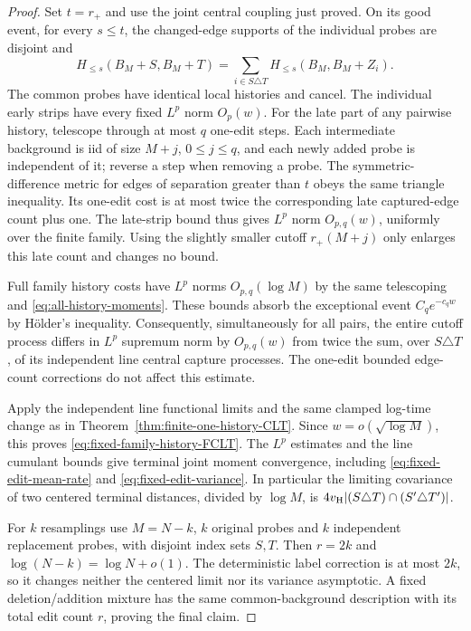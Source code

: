 \documentclass[11pt,letterpaper]{article}
\begin{document}
\begin{proof}
Set $t=r_+$ and use the joint central coupling just proved.
On its good event, for every $s\le t$, the changed-edge supports
of the individual probes are disjoint and
\[
 H_{\le s}(B_M+S,B_M+T)
       =\sum_{i\in S\triangle T}H_{\le s}(B_M,B_M+Z_i).
\]
The common probes have identical local histories and cancel.
The individual early strips have every fixed $L^p$ norm $O_p(w)$.
For the late part of any pairwise history, telescope through at
most $q$ one-edit steps. Each intermediate background is iid of
size $M+j$, $0\le j\le q$, and each newly added probe is independent
of it; reverse a step when removing a probe. The symmetric-difference
metric for edges of separation greater than $t$ obeys the same
triangle inequality. Its one-edit cost is at most twice the
corresponding late captured-edge count plus one. The late-strip
bound thus gives $L^p$ norm $O_{p,q}(w)$, uniformly over the finite
family. Using the slightly smaller cutoff $r_+(M+j)$ only enlarges
this late count and changes no bound.

Full family history costs have $L^p$ norms $O_{p,q}(\log M)$ by
the same telescoping and \eqref{eq:all-history-moments}. These
bounds absorb the exceptional event $C_qe^{-c_qw}$ by H\"older's
inequality. Consequently, simultaneously for all pairs, the
entire cutoff process differs in $L^p$ supremum norm by
$O_{p,q}(w)$ from twice the sum, over $S\triangle T$, of its
independent line central capture processes. The one-edit bounded
edge-count corrections do not affect this estimate.

Apply the independent line functional limits and the same
clamped log-time change as in
Theorem~\ref{thm:finite-one-history-CLT}. Since
$w=o(\sqrt{\log M})$, this proves
\eqref{eq:fixed-family-history-FCLT}. The $L^p$ estimates and
the line cumulant bounds give terminal joint moment convergence,
including \eqref{eq:fixed-edit-mean-rate} and
\eqref{eq:fixed-edit-variance}. In particular the limiting
covariance of two centered terminal distances, divided by
$\log M$, is
$4v_{\rm H}|(S\triangle T)\cap(S'\triangle T')|$.

For $k$ resamplings use $M=N-k$, $k$ original probes and $k$
independent replacement probes, with disjoint index sets $S,T$.
Then $r=2k$ and $\log(N-k)=\log N+o(1)$.
The deterministic label correction is at most $2k$, so it
changes neither the centered limit nor its variance asymptotic.
A fixed deletion/addition mixture has the same common-background
description with its total edit count $r$, proving the final claim.
\end{proof}
\end{document}

